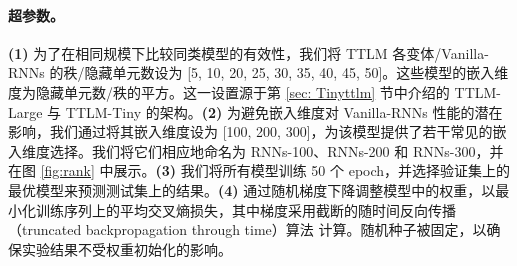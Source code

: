 



\paragraph{超参数。} \textbf{(1)} 为了在相同规模下比较同类模型的有效性，我们将 TTLM 各变体/Vanilla-RNNs 的秩/隐藏单元数设为 [5, 10, 20, 25, 30, 35, 40, 45, 50]。这些模型的嵌入维度为隐藏单元数/秩的平方。这一设置源于第 \ref{sec: Tinyttlm} 节中介绍的 TTLM-Large 与 TTLM-Tiny 的架构。\textbf{(2)} 为避免嵌入维度对 Vanilla-RNNs 性能的潜在影响，我们通过将其嵌入维度设为 [100, 200, 300]，为该模型提供了若干常见的嵌入维度选择。我们将它们相应地命名为 RNNs-100、RNNs-200 和 RNNs-300，并在图 \ref{fig:rank} 中展示。\textbf{(3)} 我们将所有模型训练 50 个 epoch，并选择验证集上的最优模型来预测测试集上的结果。\textbf{(4)} 通过随机梯度下降调整模型中的权重，以最小化训练序列上的平均交叉熵损失，其中梯度采用截断的随时间反向传播（truncated backpropagation through time）算法 \citep{werbos1990backpropagation,williams1990efficient} 计算。随机种子被固定，以确保实验结果不受权重初始化的影响。
